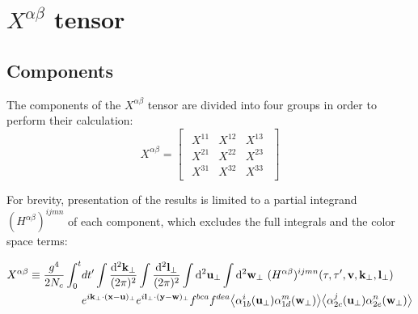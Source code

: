 \chapter{$X^{\alpha \beta}$ tensor}

\section{Components}
\label{X_components}

The components of the $X^{\alpha \beta}$ tensor are divided into four groups in order to perform their calculation:
\begin{equation}
X^{\alpha \beta}=
\begin{bmatrix}
\begin{array}{c|cc}
X^{11} & X^{12} & X^{13} \\ \hline
X^{21} & X^{22} & X^{23} \\
X^{31} & X^{32} & X^{33}
\end{array}
\end{bmatrix}
\end{equation}

For brevity, presentation of the results is limited to a partial integrand $(H^{\alpha \beta})^{ijmn}$ of each component, which excludes the full integrals and the color space terms:

\begin{equation}
\begin{split}
X^{\alpha \beta}
  \equiv \frac{g^4}{2N_c} \int_0^t & dt' \int \frac{\mathop{}\!\mathrm{d}^2 \mathbf{k_\perp}}{(2\pi)^2}
\int \frac{\mathop{}\!\mathrm{d}^2 \mathbf{l}_\perp}{(2\pi)^2}
\int \mathop{}\!\mathrm{d}^2 \mathbf{u}_\perp
\int \mathop{}\!\mathrm{d}^2 \mathbf{w}_\perp 
~ (H^{\alpha \beta})^{ijmn} (\tau, \tau',\mathbf{v},\mathbf{k}_\perp,\mathbf{l}_\perp)
\\
& e^{i \mathbf{k}_\perp \cdot (\mathbf{x} - \mathbf{u})_\perp}
e^{i \mathbf{l}_\perp \cdot (\mathbf{y} - \mathbf{w})_\perp} f^{bca} f^{dea}
 \big< \alpha^i_{1b} (\mathbf{u}_\perp) \alpha^m_{1d} (\mathbf{w}_\perp) \big>
 \big< \alpha^j_{2c} (\mathbf{u}_\perp) \alpha^n_{2e} (\mathbf{w}_\perp) \big>
\end{split}
\end{equation}

